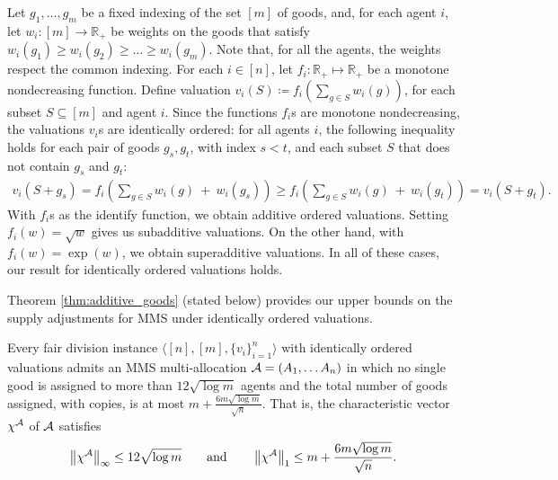 \begin{example} \label{ex:sqrt-ordered}
 Let $g_1, \dots, g_m$ be a fixed indexing of the set $[m]$ of goods, and, for each agent $i$, let $w_i : [m] \to \mathbb{R}_+$ be weights on the goods that satisfy $w_i(g_1) \geq w_i(g_2) \geq \dots \geq w_i(g_m)$. Note that, for all the agents, the weights respect the common indexing. For each $i \in [n]$, let $f_i: \mathbb{R}_+ \mapsto \mathbb{R}_+$ be a monotone nondecreasing function. Define valuation $v_i(S) \coloneqq f_i \left( \sum_{g\in S} w_i(g) \right)$, for each subset $S \subseteq [m]$ and agent $i$. Since the functions $f_i$s are monotone nondecreasing, the valuations $v_i$s are identically ordered: for all agents $i$, the following inequality holds for each pair of goods $g_s, g_t$, with index $s<t$, and each subset $S$ that does not contain $g_s$ and $g_t$: 
 \begin{align*}
v_i(S + g_s) = f_i \left( \sum_{g \in S} w_i(g)  \ +  \ w_i(g_s) \right) \geq  f_i \left( \sum_{g \in S} w_i(g)  \ +  \ w_i(g_t) \right) = v_i(S + g_t).
\end{align*}
With $f_i$s as the identify function, we obtain additive ordered valuations. Setting $f_i(w) = \sqrt{w}$ gives us subadditive valuations. On the other hand, with $f_i(w) = \exp(w)$, we obtain superadditive valuations. In all of these cases, our result for identically ordered valuations holds. 
\end{example}
 


Theorem \ref{thm:additive_goods} (stated below) provides our upper bounds on the supply adjustments for MMS under identically ordered valuations.



\begin{theorem}
\label{thm:additive_goods} Every fair division instance $\langle [n], [m], \{v_i\}_{i=1}^n \rangle$ with identically ordered valuations admits an MMS multi-allocation $\mathcal{A} = (A_1, \ldots A_n)$ in which no single good is assigned to more than $12 \sqrt{\log m}$ agents and the total number of goods assigned, with copies, is at most $m + \frac{6m  \sqrt{\log m} }{\sqrt{n}}$. That is, the characteristic vector $\chi^{\mathcal{A}}$ of $\mathcal{A}$ satisfies 
\begin{align*}
    \left\|\chi^{\mathcal{A}}\right\|_\infty \leq 12 \sqrt{\log m}  \qquad { \text{and} } \qquad \left\|\chi^{\mathcal{A}}\right\|_1 \leq m + \frac{6m  \sqrt{\log m} }{\sqrt{n}}. 
\end{align*}
\end{theorem}


